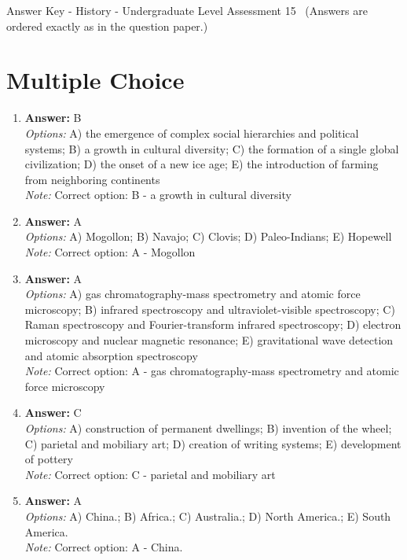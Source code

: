 \documentclass[12pt]{article}
\begin{document}
\begin{center}
Answer Key - History - Undergraduate Level Assessment 15 \
\small (Answers are ordered exactly as in the question paper.)
\end{center}

\section*{Multiple Choice}
\begin{enumerate}[label=\arabic*.]
\item \textbf{Answer:} B
\\ \textit{Options:} A) the emergence of complex social hierarchies and political systems; B) a growth in cultural diversity; C) the formation of a single global civilization; D) the onset of a new ice age; E) the introduction of farming from neighboring continents
\\ \textit{Note:} Correct option: B - a growth in cultural diversity
\item \textbf{Answer:} A
\\ \textit{Options:} A) Mogollon; B) Navajo; C) Clovis; D) Paleo-Indians; E) Hopewell
\\ \textit{Note:} Correct option: A - Mogollon
\item \textbf{Answer:} A
\\ \textit{Options:} A) gas chromatography-mass spectrometry and atomic force microscopy; B) infrared spectroscopy and ultraviolet-visible spectroscopy; C) Raman spectroscopy and Fourier-transform infrared spectroscopy; D) electron microscopy and nuclear magnetic resonance; E) gravitational wave detection and atomic absorption spectroscopy
\\ \textit{Note:} Correct option: A - gas chromatography-mass spectrometry and atomic force microscopy
\item \textbf{Answer:} C
\\ \textit{Options:} A) construction of permanent dwellings; B) invention of the wheel; C) parietal and mobiliary art; D) creation of writing systems; E) development of pottery
\\ \textit{Note:} Correct option: C - parietal and mobiliary art
\item \textbf{Answer:} A
\\ \textit{Options:} A) China.; B) Africa.; C) Australia.; D) North America.; E) South America.
\\ \textit{Note:} Correct option: A - China.
\end{enumerate}
\end{document}

